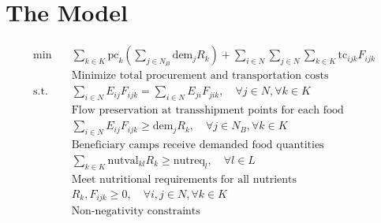 \documentclass{article}
\begin{document}
\section{The Model}
\begin{align*}
    \min \quad & \sum_{k \in K} \text{pc}_k \left( \sum_{j \in N_B} \text{dem}_j R_k \right) + \sum_{i \in N} \sum_{j \in N} \sum_{k \in K} \text{tc}_{ijk} F_{ijk} \\
    & \text{Minimize total procurement and transportation costs} \\[6pt]
    \text{s.t.} \quad & \sum_{i \in N} E_{ij} F_{ijk} = \sum_{i \in N} E_{ji} F_{jik}, \quad \forall j \in N, \forall k \in K \\
    & \text{Flow preservation at transshipment points for each food} \\[6pt]
    & \sum_{i \in N} E_{ij} F_{ijk} \geq \text{dem}_j R_k, \quad \forall j \in N_B, \forall k \in K \\
    & \text{Beneficiary camps receive demanded food quantities} \\[6pt]
    & \sum_{k \in K} \text{nutval}_{kl} R_k \geq \text{nutreq}_l, \quad \forall l \in L \\
    & \text{Meet nutritional requirements for all nutrients} \\[6pt]
    & R_k, F_{ijk} \geq 0, \quad \forall i,j \in N, \forall k \in K \\
    & \text{Non-negativity constraints}
\end{align*}
\end{document}
